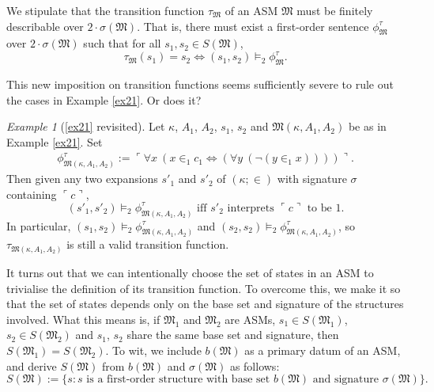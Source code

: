 \documentclass[12pt, twoside]{memoir}
\numberwithin{equation}{section}
\theoremstyle{definition}
\theoremstyle{remark}
\newtheorem{ex}[thm]{Example}
\theoremstyle{definition}
\theoremstyle{definition}
\theoremstyle{definition}
\theoremstyle{remark}
\begin{document}
We stipulate that the transition function $\tau_{\mathfrak{M}}$ of an ASM $\mathfrak{M}$ must be finitely describable over $2 \cdot \sigma(\mathfrak{M})$. That is, there must exist a first-order sentence $\phi^{\tau}_{\mathfrak{M}}$ over $2 \cdot \sigma(\mathfrak{M})$ such that for all $s_1, s_2 \in S(\mathfrak{M})$, 
\begin{equation*}
    \tau_{\mathfrak{M}}(s_1) = s_2 \iff (s_1, s_2) \models_2 \phi^{\tau}_{\mathfrak{M}} \text{.}
\end{equation*}

This new imposition on transition functions seems sufficiently severe to rule out the cases in Example \ref{ex21}. Or does it?

\begin{ex}[\ref{ex21} revisited]
Let $\kappa$, $A_1$, $A_2$, $s_1$, $s_2$ and $\mathfrak{M}(\kappa, A_1, A_2)$ be as in Example \ref{ex21}. Set 
\begin{gather*}
    \phi^{\tau}_{\mathfrak{M}(\kappa, A_1, A_2)} := \ulcorner \forall x \ (x \in_1 c_1 \iff (\forall y \ (\neg (y \in_1 x)))) \urcorner \text{.}
\end{gather*}
Then given any two expansions $s'_1$ and $s'_2$ of $(\kappa; \in)$ with signature $\sigma$ containing $\ulcorner c \urcorner$, 
\begin{equation*}
    (s'_1, s'_2) \models_2 \phi^{\tau}_{\mathfrak{M}(\kappa, A_1, A_2)} \text{ iff } s'_2 \text{ interprets } \ulcorner c \urcorner \text{ to be } 1 \text{.}
\end{equation*}
In particular, $(s_1, s_2) \models_2 \phi^{\tau}_{\mathfrak{M}(\kappa, A_1, A_2)}$ and $(s_2, s_2) \models_2 \phi^{\tau}_{\mathfrak{M}(\kappa, A_1, A_2)}$, so $\tau_{\mathfrak{M}(\kappa, A_1, A_2)}$ is still a valid transition function. 
\end{ex}

It turns out that we can intentionally choose the set of states in an ASM to trivialise the definition of its transition function. To overcome this, we make it so that the set of states depends only on the base set and signature of the structures involved. What this means is, if $\mathfrak{M}_1$ and $\mathfrak{M}_2$ are ASMs, $s_1 \in S(\mathfrak{M}_1)$, $s_2 \in S(\mathfrak{M}_2)$ and $s_1$, $s_2$ share the same base set and signature, then $S(\mathfrak{M}_1) = S(\mathfrak{M}_2)$. To wit, we include $b(\mathfrak{M})$ as a primary datum of an ASM, and derive $S(\mathfrak{M})$ from $b(\mathfrak{M})$ and $\sigma(\mathfrak{M})$ as follows: 
\begin{equation*}
    S(\mathfrak{M}) := \{s : s \text{ is a first-order structure with base set } b(\mathfrak{M}) \text{ and signature } \sigma(\mathfrak{M})\} \text{.}
\end{equation*}
\end{document}
